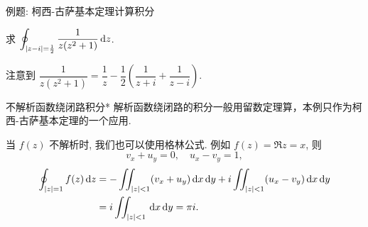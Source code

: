 \begin{frame}{例题: 柯西-古萨基本定理计算积分}
\onslide<+->
\begin{example}
求 $\displaystyle\oint_{|z-i|=\frac12}\frac1{z(z^2+1)}\,\mathrm{d} z$.
\end{example}
\onslide<+->
\begin{solution}
注意到 $\dfrac1{z(z^2+1)}=\dfrac1z-\dfrac12\left(\dfrac1{z+i}+\dfrac1{z-i}\right)$.
\onslide<+->{
\vspace{-0.5\baselineskip}
\[\oint_{|z-i|=\frac12}\frac1{z(z^2+1)}\diff z
=-\frac12\oint_{|z-i|=\frac12}\frac1{z-i}\diff z=-\pi i.\]}
\end{solution}
\end{frame}


\begin{frame}{不解析函数绕闭路积分*}
\onslide<+->
解析函数绕闭路的积分一般用留数定理算，本例只作为柯西-古萨基本定理的一个应用.

\onslide<+->
当 $f(z)$ 不解析时, 我们也可以使用格林公式.
\onslide<+->
例如 $f(z)=\Re z=x$,
\onslide<+->
则
\[v_x+u_y=0,\quad u_x-v_y=1,\]
\vspace{-\baselineskip}
\onslide<+->
\begin{align*}
\oint_{|z|=1}f(z)\,\mathrm{d} z
&=-\iint_{|z|<1}(v_x+u_y)\,\mathrm{d} x\,\mathrm{d} y+i\iint_{|z|<1}(u_x-v_y)\,\mathrm{d} x\,\mathrm{d} y\\
&=i\iint_{|z|<1}\,\mathrm{d} x\,\mathrm{d} y=\pi i.
\end{align*}
\end{frame}



